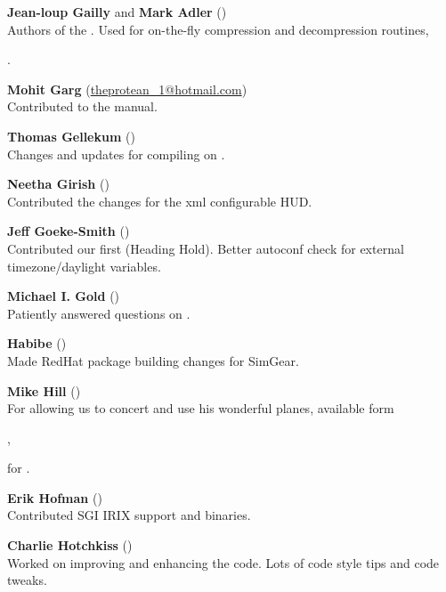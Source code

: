\noindent \textbf{Jean-loup Gailly} and \textbf{Mark
Adler} ()\\
  Authors of the .  Used for on-the-fly compression and
  decompression routines,

  .
 \medskip

\noindent \textbf{Mohit Garg}
(\href{mailto:theprotean_1@hotmail.com}{theprotean\_1@hotmail.com})\\
 Contributed to the manual.
 \medskip

\noindent \textbf{Thomas Gellekum}
()\\
  Changes and updates for compiling on .
 \medskip

\noindent \textbf{Neetha Girish}
()\\
  Contributed the changes for the xml configurable HUD.
 \medskip

\noindent \textbf{Jeff Goeke-Smith}
()\\
  Contributed our first  (Heading Hold).
  Better autoconf check for external timezone/daylight variables.
 \medskip

\noindent \textbf{Michael I. Gold}
()\\
 Patiently answered questions on .
 \medskip

\noindent \textbf{Habibe} ()\\
 Made RedHat package building changes for SimGear.
 \medskip

\noindent \textbf{Mike Hill} ()\\
 For allowing us to concert and use his wonderful planes, available form
 \medskip

 ,

 \noindent
 for \FlightGear{}.
 \medskip

\noindent \textbf{Erik Hofman} ()\\
 Contributed SGI IRIX support and binaries.
 \medskip

\noindent \textbf{Charlie Hotchkiss}
()\\ Worked on improving and enhancing the  code.
Lots of code style tips and code tweaks.
 \medskip

